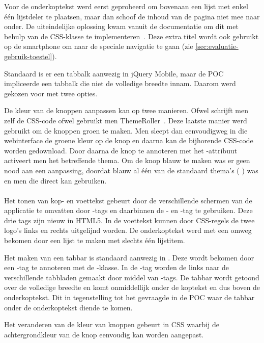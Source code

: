 Voor de onderkoptekst werd eerst geprobeerd om bovenaan een lijst met enkel één lijstdeler te plaatsen, maar dan schoof de inhoud van de pagina niet mee naar onder. 
De uiteindelijke oplossing kwam vanuit de documentatie om dit met behulp van de CSS-klasse  te implementeren~\cite{JQuery2013b}. 
Deze extra titel wordt ook gebruikt op de smartphone om naar de speciale navigatie te gaan (zie \ref{sec:evaluatie-gebruik-toestel}).

Standaard is er een tabbalk aanwezig in jQuery Mobile, maar de POC impliceerde een tabbalk die niet de volledige breedte innam.
Daarom werd gekozen voor  met twee opties.

De kleur van de knoppen aanpassen kan op twee manieren. 
Ofwel schrijft men zelf de CSS-code ofwel gebruikt men ThemeRoller~\cite{JQuery2012c}. 
Deze laatste manier werd gebruikt om de knoppen groen te maken. 
Men sleept dan eenvoudigweg in die webinterface de groene kleur op de knop en daarna kan de bijhorende CSS-code worden gedownload. 
Door daarna de knop te annoteren met het -attribuut activeert men het betreffende thema. 
Om de knop blauw te maken was er geen nood aan een aanpassing, doordat blauw al één van de standaard thema's ( ) was en men die direct kan gebruiken.

\paragraph{\lungo}
Het tonen van kop- en voettekst gebeurt door de verschillende schermen van de applicatie te omvatten door -tags en daarbinnen de - en -tag te gebruiken.
Deze drie tags zijn nieuw in HTML5.
In de voettekst kunnen door CSS-regels de twee logo's links en rechts uitgelijnd worden.
De onderkoptekst werd met een omweg bekomen door een lijst te maken met slechts één lijstitem.

Het maken van een tabbar is standaard aanwezig in \lungo{}.
Deze wordt bekomen door een -tag te annoteren met de -klasse.
In de -tag worden de links naar de verschillende tabbladen gemaakt door middel van -tags.
De tabbar wordt getoond over de volledige breedte en komt onmiddellijk onder de koptekst en dus boven de onderkoptekst.
Dit in tegenstelling tot het gevraagde in de POC waar de tabbar onder de onderkoptekst diende te komen.

Het veranderen van de kleur van knoppen gebeurt in CSS waarbij de achtergrondkleur van de knop eenvoudig kan worden aangepast.

